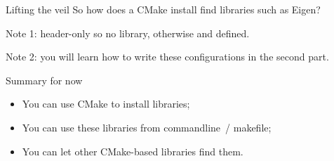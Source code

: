 \begin{numberedframe}{Lifting the veil}
  So how does a CMake install find libraries such as Eigen?

  \lstset{numbers=left,numberstyle=\tiny}
  
  Note 1: header-only so no library, otherwise
   and  defined.

  Note 2: you will learn how to write these configurations
  in the second part.
\end{numberedframe}

\begin{numberedframe}{Summary for now}
  \begin{itemize}
  \item You can use CMake to install libraries;
  \item You can use these libraries from commandline~/ makefile;
  \item You can let other CMake-based libraries find them.
  \end{itemize}
\end{numberedframe}

\endinput

\begin{numberedframe}{OpenMP from Fortran}
\begin{lstlisting}
\end{lstlisting}
\end{numberedframe}

\begin{numberedframe}{OpenMP from Fortran}
\begin{lstlisting}
\end{lstlisting}
\end{numberedframe}

